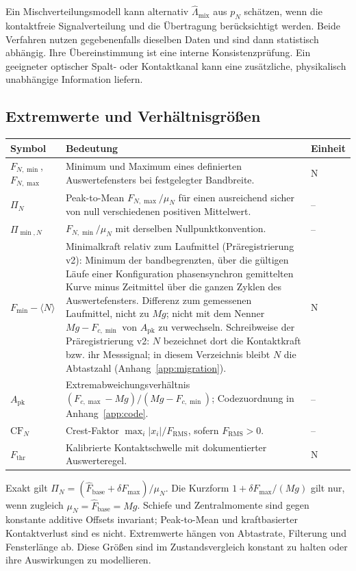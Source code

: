 \documentclass[11pt,a4paper]{article}
\makeatletter
\newenvironment{symtab}{\begin{longtable}{@{}L{.22\textwidth}L{.62\textwidth}L{.12\textwidth}@{}}\toprule\textbf{Symbol}&\textbf{Bedeutung}&\textbf{Einheit}\\\midrule\endhead}{\bottomrule\end{longtable}}
\makeatother
\begin{document}
Ein Mischverteilungsmodell kann alternativ $\hat\Lambda_{\mathrm{mix}}$ aus $p_N$ schätzen, wenn die kontaktfreie Signalverteilung und die Übertragung berücksichtigt werden. Beide Verfahren nutzen gegebenenfalls dieselben Daten und sind dann statistisch abhängig. Ihre Übereinstimmung ist eine interne Konsistenzprüfung. Ein geeigneter optischer Spalt- oder Kontaktkanal kann eine zusätzliche, physikalisch unabhängige Information liefern.

\subsection{Extremwerte und Verhältnisgrößen}
\begin{symtab}
$F_{N,\min}$, $F_{N,\max}$&Minimum und Maximum eines definierten Auswertefensters bei festgelegter Bandbreite.&N\\
$\Pi_N$&Peak-to-Mean $F_{N,\max}/\mu_N$ für einen ausreichend sicher von null verschiedenen positiven Mittelwert.&--\\
$\Pi_{\min,N}$&$F_{N,\min}/\mu_N$ mit derselben Nullpunktkonvention.&--\\
$F_{\min}-\langle N\rangle$&Minimalkraft relativ zum Laufmittel (Präregistrierung v2): Minimum der bandbegrenzten, über die gültigen Läufe einer Konfiguration phasensynchron gemittelten Kurve minus Zeitmittel über die ganzen Zyklen des Auswertefensters. Differenz zum gemessenen Laufmittel, nicht zu $Mg$; nicht mit dem Nenner $Mg-F_{c,\min}$ von $A_{\mathrm{pk}}$ zu verwechseln. Schreibweise der Präregistrierung v2: $N$ bezeichnet dort die Kontaktkraft bzw. ihr Messsignal; in diesem Verzeichnis bleibt $N$ die Abtastzahl (Anhang~\ref{app:migration}).&N\\
$A_{\mathrm{pk}}$&Extremabweichungsverhältnis $(F_{c,\max}-Mg)/(Mg-F_{c,\min})$; Codezuordnung in Anhang~\ref{app:code}.&--\\
$\mathrm{CF}_N$&Crest-Faktor $\max_i|x_i|/F_{\mathrm{RMS}}$, sofern $F_{\mathrm{RMS}}>0$.&--\\
$F_{\mathrm{thr}}$&Kalibrierte Kontaktschwelle mit dokumentierter Auswerteregel.&N\\
\end{symtab}
Exakt gilt $\Pi_N=(\hat F_{\mathrm{base}}+\delta F_{\max})/\mu_N$. Die Kurzform $1+\delta F_{\max}/(Mg)$ gilt nur, wenn zugleich $\mu_N=\hat F_{\mathrm{base}}=Mg$. Schiefe und Zentralmomente sind gegen konstante additive Offsets invariant; Peak-to-Mean und kraftbasierter Kontaktverlust sind es nicht. Extremwerte hängen von Abtastrate, Filterung und Fensterlänge ab. Diese Größen sind im Zustandsvergleich konstant zu halten oder ihre Auswirkungen zu modellieren.
\end{document}
